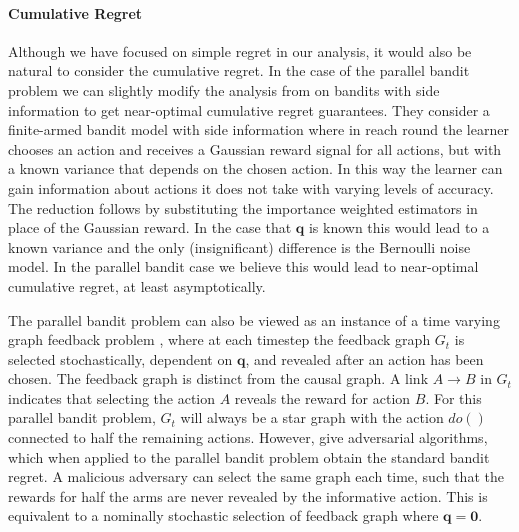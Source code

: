 \documentclass[11pt,a4paper,oneside]{book}
\renewcommand{\vec}[1]{\boldsymbol{#1}}
\begin{document}
\paragraph{Cumulative Regret}
Although we have focused on simple regret in our analysis, it would also be natural to consider the cumulative regret. In the case of the parallel bandit problem we can slightly modify the analysis from \citep{wu2015online} on bandits with side information 
to get near-optimal cumulative regret guarantees. They consider a finite-armed bandit model with side information where in reach round the learner chooses an action and receives a Gaussian reward signal for all actions, but with a known variance that depends on the chosen action. In this way the learner can gain information about actions it does not take with varying levels of accuracy. The reduction follows by substituting the importance weighted estimators in place of the Gaussian reward. In the case that $\vec{q}$ is known this would lead to a known variance and the only (insignificant) difference is the Bernoulli noise model. In the parallel bandit case we believe this would lead to near-optimal cumulative regret,
at least asymptotically. 


The parallel bandit problem can also be viewed as an instance of a time varying graph feedback problem \citep{Alon2015,Kocak2014}, where at each timestep the feedback graph $G_t$ is selected stochastically, dependent on $\boldsymbol{q}$, and revealed after an action has been chosen. The feedback graph is distinct from the causal graph. A link $A \rightarrow B$ in $G_t$ indicates that selecting the action $A$ reveals the reward for action $B$. For this parallel bandit problem, $G_t$ will always be a star graph with the action $do()$ connected to half the remaining actions. However, \citet{Alon2015,Kocak2014} give adversarial algorithms, which when applied to the parallel bandit problem obtain the standard bandit regret. A malicious adversary can select the same graph each time, such that the rewards for half the arms are never revealed by the informative action. This is equivalent to a nominally stochastic selection of feedback graph where $\boldsymbol{q} = \boldsymbol{0}$. 
\end{document}
